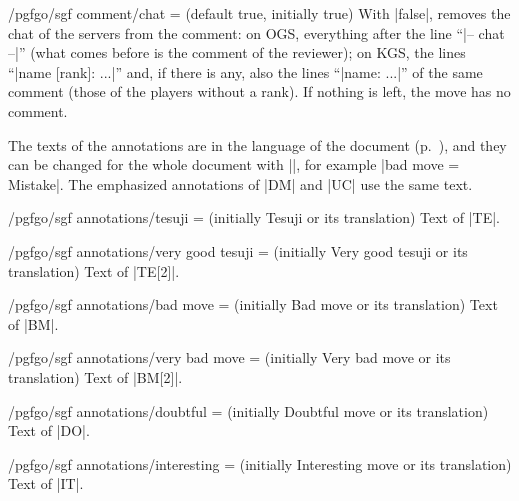 \begin{key}{/pgfgo/sgf comment/chat =  (default true, initially true)}
	With |false|, removes the chat of the servers from the comment: on OGS, everything after the line ``|-- chat --|'' (what comes before is the comment of the reviewer); on KGS, the lines ``|name [rank]: ...|'' and, if there is any, also the lines ``|name: ...|'' of the same comment (those of the players without a rank). If nothing is left, the move has no comment.
\end{key}

The texts of the annotations are in the language of the document (p.~\pageref{subsec:idiomas}), and they can be changed for the whole document with ||, for example |bad move = Mistake|. The emphasized annotations of |DM| and |UC| use the same text.

\begin{key}{/pgfgo/sgf annotations/tesuji =  (initially Tesuji or its translation)}
	Text of |TE|.

	\begin{codeexample}[]
	\end{codeexample}
\end{key}

\begin{key}{/pgfgo/sgf annotations/very good tesuji =  (initially Very good tesuji or its translation)}
	Text of |TE[2]|.
\end{key}

\begin{key}{/pgfgo/sgf annotations/bad move =  (initially Bad move or its translation)}
	Text of |BM|.
\end{key}

\begin{key}{/pgfgo/sgf annotations/very bad move =  (initially Very bad move or its translation)}
	Text of |BM[2]|.
\end{key}

\begin{key}{/pgfgo/sgf annotations/doubtful =  (initially Doubtful move or its translation)}
	Text of |DO|.
\end{key}

\begin{key}{/pgfgo/sgf annotations/interesting =  (initially Interesting move or its translation)}
	Text of |IT|.
\end{key}

